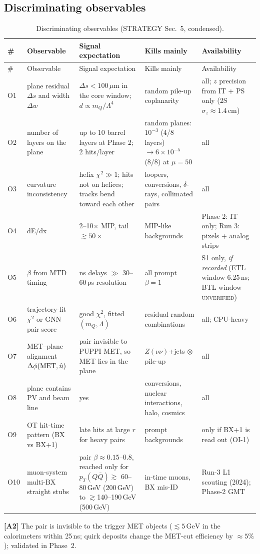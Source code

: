 \documentclass[11pt,a4paper]{article}
\newcommand{\UNV}{\textsc{unverified}}
\newcommand{\mQ}{m_Q}
\newcommand{\GeV}{\,\mathrm{GeV}}
\newcommand{\pTQQ}{p_T(Q\bar Q)}
\newcommand{\um}{\,\mu\mathrm{m}}
\newcommand{\lab}[1]{\textbf{[#1]}}
\begin{document}
\subsection{Discriminating observables}
{\small
\begin{longtable}{@{}L{0.60cm}L{3.63cm}L{5.04cm}L{3.02cm}L{3.53cm}@{}}
\caption{Discriminating observables (STRATEGY Sec.~5, condensed).}\label{tab:obs}\\
\toprule \# & Observable & Signal expectation & Kills mainly & Availability\\\midrule\endfirsthead
\toprule \# & Observable & Signal expectation & Kills mainly & Availability\\\midrule\endhead
\bottomrule\endfoot
O1 & plane residual $\Delta s$ and width $\Delta w$ & $\Delta s<100\um$ in the core window; $d\propto\mQ/\Lambda^4$ & random pile-up coplanarity & all; $z$ precision from IT + PS only (2S $\sigma_z\approx1.4$\,cm)\\
O2 & number of layers on the plane & up to 10 barrel layers at Phase 2; 2 hits/layer & random planes: $10^{-3}$ (4/8 layers) $\to6\times10^{-5}$ (8/8) at $\mu=50$ & all\\
O3 & curvature inconsistency & helix $\chi^2\gg1$; hits not on helices; tracks bend toward each other & loopers, conversions, $\delta$-rays, collimated pairs & all\\
O4 & dE/dx & 2--10$\times$ MIP, tail $\gtrsim50\times$ & MIP-like backgrounds & Phase 2: IT only; Run 3: pixels + analog strips\\
O5 & $\beta$ from MTD timing & ns delays $\gg$ 30--60\,ps resolution & all prompt $\beta=1$ & S1 only, \emph{if recorded} (ETL window 6.25\,ns; BTL window \UNV)\\
O6 & trajectory-fit $\chi^2$ or GNN pair score & good $\chi^2$, fitted $(\mQ,\Lambda)$ & residual random combinations & all; CPU-heavy\\
O7 & MET--plane alignment $\Delta\phi({\rm MET},\hat n)$ & pair invisible to PUPPI MET, so MET lies in the plane & $Z(\nu\nu)$+jets $\otimes$ pile-up & all\\
O8 & plane contains PV and beam line & yes & conversions, nuclear interactions, halo, cosmics & all\\
O9 & OT hit-time pattern (BX vs BX+1) & late hits at large $r$ for heavy pairs & prompt backgrounds & only if BX+1 is read out (OI-1)\\
O10 & muon-system multi-BX straight stubs & pair $\beta\approx0.15$--0.8, reached only for $\pTQQ\gtrsim$ 60--80\,GeV (200\,GeV) to $\gtrsim$140--190\,GeV (500\,GeV) & in-time muons, BX mis-ID & Run-3 L1 scouting (2024); Phase-2 GMT\\
\end{longtable}
}
\lab{A2} The pair is invisible to the trigger MET objects ($\lesssim5\GeV$ in the calorimeters within 25\,ns; quirk deposits change the MET-cut efficiency by $\approx5\%$); validated in Phase~2.
\end{document}
